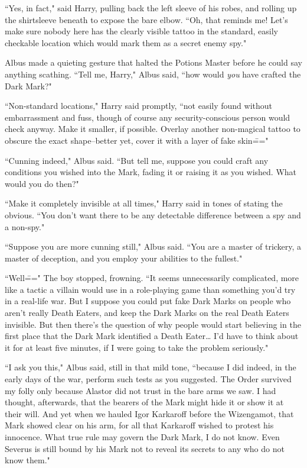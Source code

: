 ``Yes, in fact," said Harry, pulling back the left sleeve of his robes, and rolling up the shirtsleeve beneath to expose the bare elbow. ``Oh, that reminds me! Let's make sure nobody here has the clearly visible tattoo in the standard, easily checkable location which would mark them as a secret enemy spy."

Albus made a quieting gesture that halted the Potions Master before he could say anything scathing. ``Tell me, Harry," Albus said, ``how would \emph{you} have crafted the Dark Mark?"

``Non-standard locations," Harry said promptly, ``not easily found without embarrassment and fuss, though of course any security-conscious person would check anyway. Make it smaller, if possible. Overlay another non-magical tattoo to obscure the exact shape\---better yet, cover it with a layer of fake skin\==="

``Cunning indeed," Albus said. ``But tell me, suppose you could craft any conditions you wished into the Mark, fading it or raising it as you wished. What would you do then?"

``Make it completely invisible at all times," Harry said in tones of stating the obvious. ``You don't want there to be any detectable difference between a spy and a non-spy."

``Suppose you are more cunning still," Albus said. ``You are a master of trickery, a master of deception, and you employ your abilities to the fullest."

``Well\===" The boy stopped, frowning. ``It seems unnecessarily complicated, more like a tactic a villain would use in a role-playing game than something you'd try in a real-life war. But I suppose you could put fake Dark Marks on people who aren't really Death Eaters, and keep the Dark Marks on the real Death Eaters invisible. But then there's the question of why people would start believing in the first place that the Dark Mark identified a Death Eater{\ldots} I'd have to think about it for at least five minutes, if I were going to take the problem seriously."

``I ask you this," Albus said, still in that mild tone, ``because I did indeed, in the early days of the war, perform such tests as you suggested. The Order survived my folly only because Alastor did not trust in the bare arms we saw. I had thought, afterwards, that the bearers of the Mark might hide it or show it at their will. And yet when we hauled Igor Karkaroff before the Wizengamot, that Mark showed clear on his arm, for all that Karkaroff wished to protest his innocence. What true rule may govern the Dark Mark, I do not know. Even Severus is still bound by his Mark not to reveal its secrets to any who do not know them."


